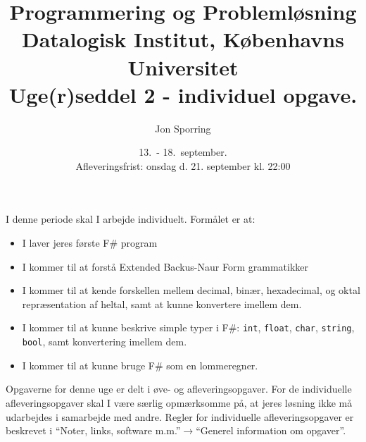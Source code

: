 \documentclass[a4paper,12pt]{article}
\title{Programmering og Problemløsning\\Datalogisk Institut,
  Københavns Universitet\\Uge(r)seddel 2 - individuel opgave.}
\author{Jon Sporring}
\date{13.\ - 18.\ september.\\Afleveringsfrist: onsdag d. 21. september kl. 22:00}
\begin{document}
\maketitle

I denne periode skal I arbejde individuelt. Formålet er at:
\begin{itemize}
\item I laver jeres første F\# program
\item I kommer til at forstå Extended Backus-Naur Form grammatikker
\item I kommer til at kende forskellen mellem decimal, binær, hexadecimal, og oktal repræsentation af heltal, samt at kunne konvertere imellem dem.
\item I kommer til at kunne beskrive simple typer i F\#: \lstinline{int}, \lstinline{float}, \lstinline{char}, \lstinline{string}, \lstinline{bool}, samt konvertering imellem dem.
\item I kommer til at kunne bruge F\# som en lommeregner.
\end{itemize}

Opgaverne for denne uge er delt i øve- og afleveringsopgaver. For de individuelle afleveringsopgaver skal I være særlig opmærksomme på, at jeres løsning ikke må udarbejdes i samarbejde med andre. Regler for individuelle afleveringsopgaver er beskrevet i "`Noter, links, software m.m."'$\rightarrow$"`Generel information om opgaver"'.
\end{document}
